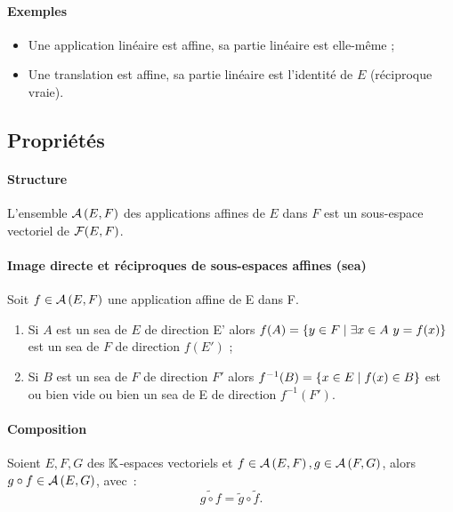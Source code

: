 \paragraph{Exemples}
\begin{itemize}
    \item Une application linéaire est affine, sa partie linéaire est elle-même ;
    \item Une translation est affine, sa partie linéaire est l'identité de $E$
        (réciproque vraie).
\end{itemize}
\subsection{Propriétés}

\paragraph{Structure}
\begin{prop}
    L'ensemble $\mathcal{A}\left(E,F\right)$ des applications affines de $E$ dans $F$ est un
    sous-espace vectoriel de $\mathcal{F}(E,F)$.
\end{prop}
\paragraph{Image directe et réciproques de sous-espaces affines (sea)}
\begin{prop}
	Soit $f \in \mathcal{A}\left(E,F\right)$ une application affine de E dans F.
	\begin{enumerate}
		\item Si $A$ est un sea de $E$ de direction E' alors $f(A) = \left\{y \in F\mathrel{}\middle|\mathrel{}\exists x \in A \ y= f(x)\right\}$ est un sea de $F$ de direction $f(E')$ ;
		\item Si $B$ est un sea de $F$ de direction $F'$ alors $f^{-1}(B) = \left\{x \in E\mathrel{}\middle|\mathrel{}f(x) \in B\right\}$ est ou bien vide ou bien un sea de E de direction $f^{-1}(F')$.
	\end{enumerate}
\end{prop}
\paragraph{Composition}
\begin{prop}
	Soient $E, F, G$ des $\mathbb{K}$-espaces vectoriels et $f \in \mathcal{A}\left(E,F\right), g \in \mathcal{A}\left(F,G\right)$, alors $g \circ f \in \mathcal{A}\left(E,G\right)$, avec~:
	\begin{equation}
		\widetilde{g \circ f} = \tilde{g} \circ \tilde{f}.
	\end{equation}
\end{prop}
